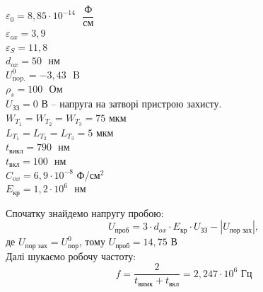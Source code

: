 \documentclass[a4paper,14pt]{extreport}
\begin{document}
	$\varepsilon_{0}=8,85 \cdot 10^{-14} \text{ }\dfrac{\text{Ф}}{\text{см}}$\\
	\vspace{0.2cm}
	$\varepsilon_{ox}=3,9$\\
	\vspace{0.2cm}
	$\varepsilon_{S}=11,8$\\
	\vspace{0.2cm}
	$ d_{o x}=50 \text{ } \text{нм}$\\
	\vspace{0.2cm}
	$ U_{\text{nop.}}^{0}=-3,43 \text{ }\text{B}$\\
	\vspace{0.2cm}
	$ \rho_{s}=100 \text{ }\text{Ом}$\\
	\vspace{0.2 cm}
	$U_{\text{ЗЗ}} = 0 $ В -- напруга на затворі пристрою захисту.\\
	\vspace{0.2 cm}
	$W_{T_1} = W_{T_2} = W_{T_3} = 75 $ мкм\\ 
	\vspace{0.2 cm}
	$L_{T_1} = L_{T_2} = L_{T_3} = 5 $ мкм\\
	\vspace{0.2 cm}
	$t_{\text{викл}} = 790 \text{ } \text{нм}$\\
	\vspace{0.2 cm}
	$t_{\text{вкл}} = 100 \text{ } \text{нм}$\\
	\vspace{0.2 cm}
	$C_{ox} = 6,9\cdot 10^{-8}$  \text{ } Ф/см$^2$\\
	\vspace{0.2 cm}
	$E_{\text{кр}} = 1,2 \cdot 10^6 \text{ } \text{нм}$\\
	\vspace{0.2 cm}





	Спочатку знайдемо напругу пробою:
	\begin{equation}
	U_{\text{проб}} = 3 \cdot d_{ox} \cdot E_{\text{кр}} \cdot U_{\text{ЗЗ}} - |U_{\text{пор зах}} |, 
	\end{equation}
	де $U_{\text{пор зах}}  = U_{\text{пор}}^0$, тому $U_{\text{проб}} =  14,75 $ В\\

	Далі шукаємо робочу частоту:
	\begin{equation}
	f = \dfrac{2}{t_{\text{вимк}} + t_{\text{вкл}}} = 2,247 \cdot 10^{6} \text{ Гц}
	\end{equation}
\end{document}
